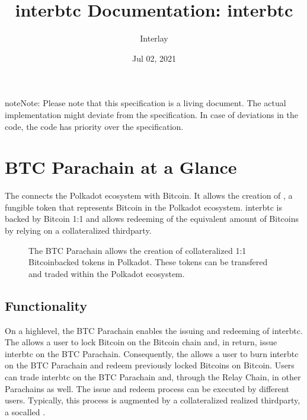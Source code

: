 \documentclass[a4paper,10pt,english]{sphinxmanual}
\title{interbtc Documentation: interbtc}
\date{Jul 02, 2021}
\author{Interlay}
\begin{document}
\pagestyle{empty}
\sphinxmaketitle
\pagestyle{plain}
\sphinxtableofcontents
\pagestyle{normal}
\label{\detokenize{index::doc}}


\begin{sphinxadmonition}{note}{Note:}
Please note that this specification is a living document. The actual implementation might deviate from the specification. In case of deviations in the code, the code has priority over the specification.
\end{sphinxadmonition}


\chapter{BTC Parachain at a Glance}
\label{\detokenize{intro/at-a-glance:btc-parachain-at-a-glance}}\label{\detokenize{intro/at-a-glance::doc}}
The  connects the Polkadot ecosystem with Bitcoin.
It allows the creation of , a fungible token that represents Bitcoin in the Polkadot ecosystem.
interbtc is backed by Bitcoin 1:1 and allows redeeming of the equivalent amount of Bitcoins by relying on a collateralized third\sphinxhyphen{}party.

\begin{figure}[htbp]
\centering
\capstart

\noindent{}
\caption{The BTC Parachain allows the creation of collateralized 1:1 Bitcoin\sphinxhyphen{}backed tokens in Polkadot. These tokens can be transfered and traded within the Polkadot ecosystem.}\label{\detokenize{intro/at-a-glance:id1}}\end{figure}


\section{Functionality}
\label{\detokenize{intro/at-a-glance:functionality}}
On a high\sphinxhyphen{}level, the BTC Parachain enables the issuing and redeeming of interbtc.
The  allows a user to lock Bitcoin on the Bitcoin chain and, in return, issue interbtc on the BTC Parachain.
Consequently, the  allows a user to burn interbtc on the BTC Parachain and redeem previously locked Bitcoins on Bitcoin.
Users can trade interbtc on the BTC Parachain and, through the Relay Chain, in other Parachains as well.
The issue and redeem process can be executed by different users.
Typically, this process is augmented by a collateralized realized third\sphinxhyphen{}party, a so\sphinxhyphen{}called .
\end{document}
